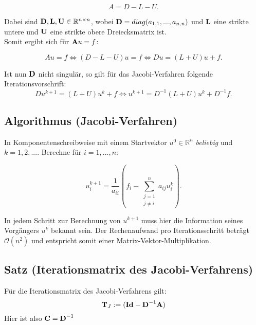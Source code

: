 \begin{equation}
A = D - L - U.
\end{equation}

Dabei sind ${\textbf{D}},{\textbf{L}},{\textbf{U}} \in \mathbb{R}^{n \times n}$, wobei ${\textbf{D}} = diag(a_{1,1},...,a_{n,n})$ und ${\textbf{L}}$ eine strikte untere und ${\textbf{U}}$ eine strikte obere Dreiecksmatrix ist. \\
Somit ergibt sich für ${\textbf{A}}u = f$:

\begin{equation}
Au = f \Leftrightarrow (D-L-U)u = f \Leftrightarrow Du = (L+U)u + f.
\end{equation}

Ist nun ${\textbf{D}}$ nicht singulär, so gilt für das Jacobi-Verfahren folgende Iterationsvorschrift:
\begin{equation}
Du^{k+1} = (L+U)u^{k} + f \Leftrightarrow u^{k+1} = D^{-1}(L+U)u^{k} + D^{-1}f.
\end{equation}

\subsection{Algorithmus (Jacobi-Verfahren)}\label{ss.Allgemeines Jacobi-Verfahren}
In Komponentenschreibweise mit einem Startvektor $u^{0} \in \mathbb{R}^{n}$ \textit{beliebig} und $k=1,2,...$. Berechne für $i=1,...,n$:

\begin{equation}
u^{k+1}_{i} = \frac {1} {a_{ii}} (f_{i} - \sum_{\substack{j = 1 \\ j \ne i}}^{n} a_{ij}u^{k}_{i}).
\end{equation}

In jedem Schritt zur Berechnung von $u^{k+1}$ muss hier die Information seines Vorgängers $u^{k}$ bekannt sein. Der Rechenaufwand pro Iterationsschritt beträgt $\mathcal{O}(n^{2})$ und entspricht somit einer Matrix-Vektor-Multiplikation.

\subsection{Satz (Iterationsmatrix des Jacobi-Verfahrens)}\label{ss.Iterationsmatrix Jacobi}

Für die Iterationsmatrix des Jacobi-Verfahrens gilt:
\begin{equation}
{\textbf{T}}_{J} := ({\textbf{Id}} - {\textbf{D}}^{-1} {\textbf{A}})
\end{equation}
Hier ist also ${\textbf{C}} = {\textbf{D}}^{-1}$

